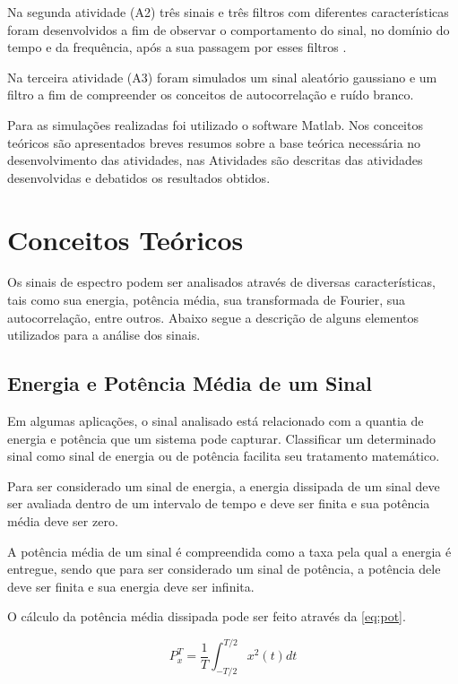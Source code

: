 \documentclass[11pt]{classes/ifscarticle}
\begin{document}
Na segunda atividade (A2) três sinais e três filtros com diferentes características foram desenvolvidos a fim de observar o comportamento do sinal, no domínio do tempo e da frequência, após a sua passagem por esses filtros .

Na terceira atividade (A3) foram simulados um sinal aleatório gaussiano e um filtro a fim de compreender os conceitos de autocorrelação e ruído branco.

Para as simulações realizadas foi utilizado o software Matlab. Nos conceitos teóricos são apresentados breves resumos sobre a base teórica necessária no desenvolvimento das atividades, nas Atividades são descritas das atividades desenvolvidas e debatidos os resultados obtidos. 


\section{Conceitos Teóricos}
\label{sec:conceitos}

Os sinais de espectro podem ser analisados através de diversas características, tais como sua energia, potência média, sua transformada de Fourier, sua autocorrelação, entre outros. Abaixo segue a descrição de alguns elementos utilizados para a análise dos sinais. 

\subsection{Energia e Potência Média de um Sinal}
\label{sec:potencia}
Em algumas aplicações, o sinal analisado está relacionado com a quantia de energia e potência que um sistema pode capturar. Classificar um determinado sinal como sinal de energia ou de potência facilita seu tratamento matemático.

Para ser considerado um sinal de energia, a energia dissipada de um sinal deve ser avaliada dentro de um intervalo de tempo e deve ser finita e sua potência média deve ser zero. 

A potência média de um sinal é compreendida como a taxa pela qual a energia é entregue, sendo que para ser considerado um sinal de potência, a potência dele deve ser finita e sua energia deve ser infinita.

O cálculo da potência média dissipada pode ser feito através da \autoref{eq:pot}.

 \begin{equation}
     P_x^T = \frac{1}{T}\int_{-T/2}^{T/2} x^2(t) dt
     \label{eq:pot}
 \end{equation}
\end{document}
